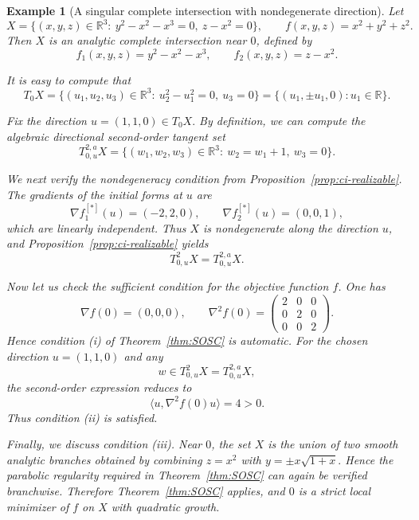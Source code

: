 \documentclass[10pt,reqno]{amsart}
\theoremstyle{break-italic}
\theoremstyle{break-italic}
\theoremstyle{break-italic}
\theoremstyle{break-italic}
\theoremstyle{break-italic}
\theoremstyle{break-italic}
\theoremstyle{break-italic}
\theoremstyle{break-italic}
\theoremstyle{break-roman}
\newtheorem{example}[satz]{Example}
\theoremstyle{standard}
\theoremstyle{varthm-roman}
\theoremstyle{varthm-italic}
\theoremstyle{varthm-roman-break}
\theoremstyle{varthm-italic-break}
\theoremstyle{varthm-roman-no-punctuation}
\theoremstyle{varthm-italic-no-punctuation}
\numberwithin{equation}{section}
\begin{document}
\begin{example}[A singular complete intersection with nondegenerate direction]
\label{ex:opt-complete-intersection}
Let
\[
X=\{(x,y,z)\in\mathbb R^3:\ y^2-x^2-x^3=0,\ z-x^2=0\},
\qquad
f(x,y,z)=x^2+y^2+z^2.
\]
Then $X$ is an analytic complete intersection near $0$, defined by
\[
f_1(x,y,z)=y^2-x^2-x^3,
\qquad
f_2(x,y,z)=z-x^2.
\]

It is easy to compute that
\[
T_0X=\{(u_1,u_2,u_3)\in\mathbb R^3:\ u_2^2-u_1^2=0,\ u_3=0\}
=
\{(u_1,\pm u_1,0):u_1\in\mathbb R\}.
\]

Fix the direction
\(
u=(1,1,0)\in T_0X.
\)
By definition, we can compute the algebraic directional second-order tangent set 
\[
T^{2,a}_{0,u}X
=
\{(w_1,w_2,w_3)\in\mathbb R^3:\ w_2=w_1+1,\ w_3=0\}.
\]

We next verify the nondegeneracy condition from
Proposition~\ref{prop:ci-realizable}. The gradients of the initial forms at
$u$ are
\[
\nabla f_1^{[\ast]}(u)=(-2,2,0),
\qquad
\nabla f_2^{[\ast]}(u)=(0,0,1),
\]
which are linearly independent. Thus $X$ is nondegenerate along the direction
$u$, and Proposition~\ref{prop:ci-realizable} yields
\[
T^2_{0,u}X=T^{2,a}_{0,u}X.
\]

Now let us check the sufficient condition for the objective function $f$. One
has
\[
\nabla f(0)=(0,0,0),
\qquad
\nabla^2 f(0)=
\begin{pmatrix}
2&0&0\\
0&2&0\\
0&0&2
\end{pmatrix}.
\]
Hence condition {\rm(i)} of Theorem~\ref{thm:SOSC} is automatic. For the chosen
direction $u=(1,1,0)$ and any
\[
w\in T^2_{0,u}X=T^{2,a}_{0,u}X,
\]
the second-order expression reduces to
\[
\langle u,\nabla^2 f(0)u\rangle
=4>0.
\]
Thus condition {\rm(ii)} is satisfied.

Finally, we discuss condition {\rm(iii)}. Near $0$, the set $X$ is the union of
two smooth analytic branches obtained by combining
\(
z=x^2
\)
with
\(
y=\pm x\sqrt{1+x}.
\)
Hence the parabolic regularity required in Theorem~\ref{thm:SOSC} can again be
verified branchwise. Therefore Theorem~\ref{thm:SOSC} applies, and $0$ is a
strict local minimizer of $f$ on $X$ with quadratic growth.
\end{example}
\end{document}
